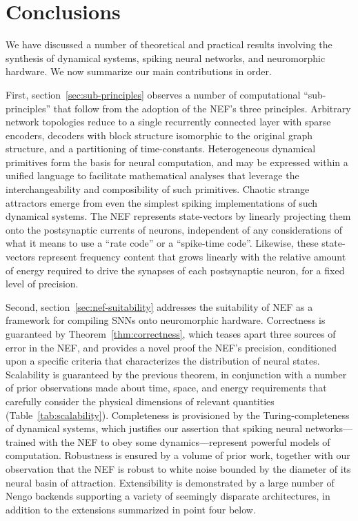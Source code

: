 \chapter{Conclusions}
\label{chapt:conclusions}

We have discussed a number of theoretical and practical results involving the synthesis of dynamical systems, spiking neural networks, and neuromorphic hardware.
We now summarize our main contributions in order.

First, section~\ref{sec:sub-principles} observes a number of computational ``sub-principles'' that follow from the adoption of the NEF's three principles.
Arbitrary network topologies reduce to a single recurrently connected layer with sparse encoders, decoders with block structure isomorphic to the original graph structure, and a partitioning of time-constants.
Heterogeneous dynamical primitives form the basis for neural computation, and may be expressed within a unified language to facilitate mathematical analyses that leverage the interchangeability and composibility of such primitives.
Chaotic strange attractors emerge from even the simplest spiking implementations of such dynamical systems.
The NEF represents state-vectors by linearly projecting them onto the postsynaptic currents of neurons,  independent of any considerations of what it means to use a ``rate code'' or a ``spike-time code''.
Likewise, these state-vectors represent frequency content that grows linearly with the relative amount of energy required to drive the synapses of each postsynaptic neuron, for a fixed level of precision.

Second, section~\ref{sec:nef-suitability} addresses the suitability of NEF as a framework for compiling SNNs onto neuromorphic hardware.
Correctness is guaranteed by Theorem~\ref{thm:correctness}, which teases apart three sources of error in the NEF, and provides a novel proof the NEF's precision, conditioned upon a specific criteria that characterizes the distribution of neural states.
Scalability is guaranteed by the previous theorem, in conjunction with a number of prior observations made about time, space, and energy requirements that carefully consider the physical dimensions of relevant quantities (Table~\ref{tab:scalability}).
Completeness is provisioned by the Turing-completeness of dynamical systems, which justifies our assertion that spiking neural networks---trained with the NEF to obey some dynamics---represent powerful models of computation.
Robustness is ensured by a volume of prior work, together with our observation that the NEF is robust to white noise bounded by the diameter of its neural basin of attraction.
Extensibility is demonstrated by a large number of Nengo backends supporting a variety of seemingly disparate architectures, in addition to the extensions summarized in point four below.

